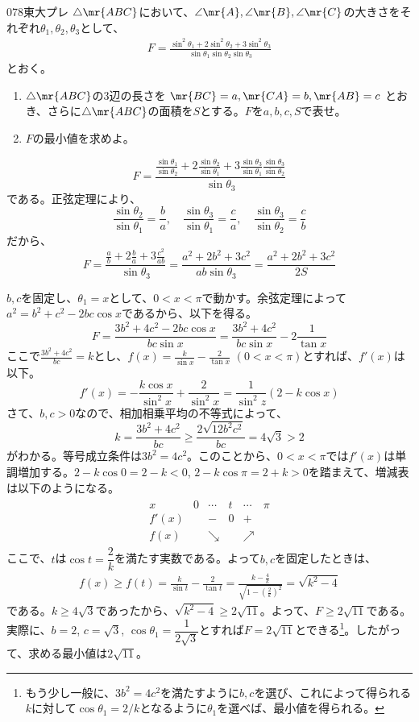 \begin{prob}{078}{}{東大プレ}
 $\triangle\mr{ABC}$において、$\angle\mr{A}, \angle\mr{B}, \angle\mr{C}$の大きさをそれぞれ$\theta_1, \theta_2, \theta_3$として、
 \begin{align*}
  F=\frac{\sin^2\theta_1+2\sin^2\theta_2+3\sin^2\theta_3}{\sin\theta_1 \sin\theta_2 \sin\theta_3}
 \end{align*}
 とおく。
 \begin{enumerate}
  \item $\triangle\mr{ABC}$の3辺の長さを $\mr{BC}=a, \mr{CA}=b, \mr{AB}=c$ とおき、さらに$\triangle\mr{ABC}$の面積を$S$とする。$F$を$a, b, c, S$で表せ。
  \item $F$の最小値を求めよ。
 \end{enumerate}
\end{prob}
\[ F=\frac{\frac{\sin\theta_1}{\sin\theta_2}+2\frac{\sin\theta_2}{\sin\theta_1}+3\frac{\sin\theta_3}{\sin\theta_1}\frac{\sin\theta_3}{\sin\theta_2}}{\sin\theta_3} \]
である。正弦定理により、
\[ \frac{\sin\theta_2}{\sin\theta_1}=\frac{b}{a},\quad \frac{\sin\theta_3}{\sin\theta_1}=\frac{c}{a},\quad \frac{\sin\theta_3}{\sin\theta_2}=\frac{c}{b} \]
だから、
\[ F=\frac{\frac{a}{b}+2\frac{b}{a}+3\frac{c^2}{ab}}{\sin\theta_3}=\frac{a^2+2b^2+3c^2}{ab\sin\theta_3}=\frac{a^2+2b^2+3c^2}{2S} \]

$b, c$を固定し、$\theta_1=x$として、$0<x<\pi$で動かす。余弦定理によって$a^2=b^2+c^2-2bc\cos x$であるから、以下を得る。
\[ F=\frac{3b^2+4c^2-2bc\cos x}{bc\sin x}=\frac{3b^2+4c^2}{bc\sin x}-2\frac{1}{\tan x} \]
ここで$\frac{3b^2+4c^2}{bc}=k$とし、$f(x)=\frac{k}{\sin x}-\frac{2}{\tan x}$ $(0<x<\pi)$とすれば、$f'(x)$は以下。
\[ f'(x)=-\frac{k\cos x}{\sin^2 x}+\frac{2}{\sin^2 x}=\frac{1}{\sin^2 z}(2-k\cos x) \]
さて、$b, c>0$なので、相加相乗平均の不等式によって、
\[ k=\frac{3b^2+4c^2}{bc}\ge\frac{2\sqrt{12b^2c^2}}{bc}=4\sqrt{3}>2 \]
がわかる。等号成立条件は$3b^2=4c^2$。このことから、$0<x<\pi$では$f'(x)$は単調増加する。$2-k\cos 0=2-k<0$, $2-k\cos\pi=2+k>0$を踏まえて、増減表は以下のようになる。
\begin{align*}
 \begin{array}{c|c|c|c|c|c}
  x& 0 & \cdots & t & \cdots & \pi \\ \hline
  f'(x) & & - & 0 & + &  \\ \hline
  f(x) & & \searrow & & \nearrow & 
 \end{array}
\end{align*}
ここで、$t$は$\cos t=\dfrac{2}{k}$を満たす実数である。よって$b, c$を固定したときは、
\begin{align*}
 f(x)\ge f(t)=\frac{k}{\sin t} -\frac{2}{\tan t}=\frac{k-\frac{4}{k}}{\sqrt{1-\left(\frac{2}{k}\right)^2}}=\sqrt{k^2-4}
\end{align*}
である。$k\ge 4\sqrt{3}$であったから、$\sqrt{k^2-4}\ge 2\sqrt{11}$。よって、$F\ge 2\sqrt{11}$である。実際に、$b=2$, $c=\sqrt{3}$, $\cos\theta_1=\dfrac{1}{2\sqrt{3}}$とすれば$F=2\sqrt{11}$とできる\footnote{もう少し一般に、$3b^2=4c^2$を満たすように$b, c$を選び、これによって得られる$k$に対して$\cos\theta_1=2/k$となるように$\theta_1$を選べば、最小値を得られる。}。したがって、求める最小値は$2\sqrt{11}$。
